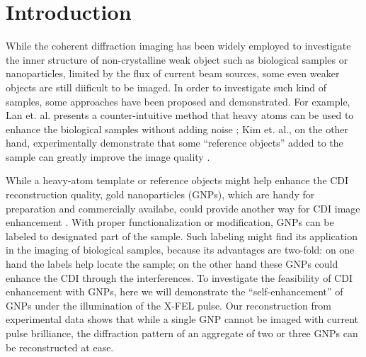 \documentclass[aps,prb,reprint,groupedaddress, superscriptaddress]{revtex4-1}
\begin{document}
\pacs{}

\maketitle

\section{Introduction}
While the coherent diffraction imaging has been widely employed to investigate the inner structure of non-crystalline weak object such as biological samples or nanoparticles, limited by the flux of current beam sources, some even weaker objects are still diificult to be imaged. 
In order to investigate such kind of samples, some approaches have been proposed and demonstrated. For example, Lan et. al. presents a counter-intuitive method that heavy atoms can be used to enhance the biological samples without adding noise \cite{template}; Kim et. al., on the other hand, experimentally demonstrate that some ``reference objects'' added to the sample can greatly improve the image quality \cite{ref-obj}. 

While a heavy-atom template or reference objects might help enhance the CDI reconstruction quality, gold nanoparticles (GNPs), which are handy for preparation and commercially availabe, could provide another way for CDI image enhancement \cite{shintake}.
With proper functionalization or modification, GNPs can be labeled to designated part of the sample.
Such labeling might find its application in the imaging of biological samples, because its advantages are two-fold: on one hand the labels help locate the sample; on the other hand these GNPs could enhance the CDI through the interferences.
To investigate the feasibility of CDI enhancement with GNPs, here we will demonstrate the ``self-enhancement'' of GNPs under the illumination of the X-FEL pulse. Our reconstruction from experimental data shows that while a single GNP cannot be imaged with current pulse brilliance, the diffraction pattern of an aggregate of two or three GNPs can be reconstructed at ease.
\end{document}
